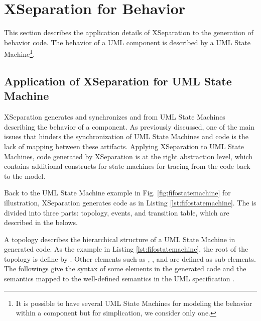 \section{XSeparation for Behavior}
\label{sec:xseparationbehavior}
This section describes the application details of XSeparation to the generation of behavior code.
The behavior of a UML component is described by a UML State Machine\footnote{It is possible to have several UML State Machines for modeling the behavior within a component but for simplication, we consider only one.}.







\subsection{Application of XSeparation for UML State Machine}
XSeparation generates and synchronizes  and  from UML State Machines describing the behavior of a component.
As previously discussed, one of the main issues that hinders the synchronization of UML State Machines and code is the lack of mapping between these artifacts.
Applying XSeparation to UML State Machines, code generated by XSeparation is at the right abstraction level, which contains additional constructs for state machines for tracing from the code back to the model.
 
Back to the UML State Machine example in Fig. \ref{fig:fifostatemachine} for illustration, XSeparation generates code as in Listing \ref{lst:fifostatemachine}.
The  is divided into three parts: topology, events, and transition table, which are described in the belows.




\vskip 0.2cm
\noindent
{}
A topology describes the hierarchical structure of a UML State Machine in generated code.
As the example in Listing \ref{lst:fifostatemachine}, the root of the topology is define by .
Other elements such as , , and  are defined as sub-elements.
The followings give the syntax of some elements in the generated code and the semantics mapped to the well-defined semantics in the UML specification \cite{OMG2015}.


\begin{minipage}{0.95\columnwidth}
	
\end{minipage}

